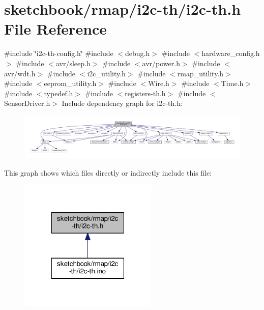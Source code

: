 \hypertarget{i2c-th_8h}{}\section{sketchbook/rmap/i2c-\/th/i2c-\/th.h File Reference}
\label{i2c-th_8h}
{\ttfamily \#include \char`\"{}i2c-\/th-\/config.\+h\char`\"{}}\newline
{\ttfamily \#include $<$debug.\+h$>$}\newline
{\ttfamily \#include $<$hardware\+\_\+config.\+h$>$}\newline
{\ttfamily \#include $<$avr/sleep.\+h$>$}\newline
{\ttfamily \#include $<$avr/power.\+h$>$}\newline
{\ttfamily \#include $<$avr/wdt.\+h$>$}\newline
{\ttfamily \#include $<$i2c\+\_\+utility.\+h$>$}\newline
{\ttfamily \#include $<$rmap\+\_\+utility.\+h$>$}\newline
{\ttfamily \#include $<$eeprom\+\_\+utility.\+h$>$}\newline
{\ttfamily \#include $<$Wire.\+h$>$}\newline
{\ttfamily \#include $<$Time.\+h$>$}\newline
{\ttfamily \#include $<$typedef.\+h$>$}\newline
{\ttfamily \#include $<$registers-\/th.\+h$>$}\newline
{\ttfamily \#include $<$Sensor\+Driver.\+h$>$}\newline
Include dependency graph for i2c-\/th.h\+:
\nopagebreak
\begin{figure}[H]
\begin{center}
\leavevmode
\includegraphics[width=350pt]{i2c-th_8h__incl}
\end{center}
\end{figure}
This graph shows which files directly or indirectly include this file\+:
\nopagebreak
\begin{figure}[H]
\begin{center}
\leavevmode
\includegraphics[width=187pt]{i2c-th_8h__dep__incl}
\end{center}
\end{figure}
